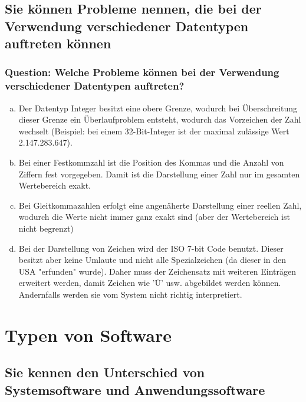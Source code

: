 \documentclass{article}
\begin{document}
\begin{adjustwidth}{2em}{2em}
\begin{adjustwidth}{2em}{2em}
			\subsection{Sie können Probleme nennen, die bei der Verwendung verschiedener Datentypen auftreten können}
			\begin{adjustwidth}{1em}{}
				\subsubsection*{Question: Welche Probleme können bei der Verwendung verschiedener Datentypen auftreten?}
				\begin{adjustwidth}{1em}{}
					\begin{enumerate}[(a)]
						\item Der Datentyp Integer besitzt eine obere Grenze, wodurch bei Überschreitung dieser Grenze ein Überlaufproblem entsteht, wodurch das Vorzeichen der Zahl wechselt (Beispiel: bei einem 32-Bit-Integer ist der maximal zulässige Wert 2.147.283.647).
						\item Bei einer Festkommzahl ist die Position des Kommas und die Anzahl von Ziffern fest vorgegeben. Damit ist die Darstellung einer Zahl nur im gesamten Wertebereich exakt.
						\item Bei Gleitkommazahlen erfolgt eine angenäherte Darstellung einer reellen Zahl, wodurch die Werte nicht immer ganz exakt sind (aber der Wertebereich ist nicht begrenzt)
						\item Bei der Darstellung von Zeichen wird der ISO 7-bit Code benutzt. Dieser besitzt aber keine Umlaute und nicht alle Spezialzeichen (da dieser in den USA "erfunden" wurde). Daher muss der Zeichensatz mit weiteren Einträgen erweitert werden, damit Zeichen wie 'Ü' usw. abgebildet werden können. Andernfalls werden sie vom System nicht richtig interpretiert.
					\end{enumerate}
				\end{adjustwidth}
			\end{adjustwidth}
		\end{adjustwidth}
		
		\newpage		
		
		\section{Typen von Software}
		\begin{adjustwidth}{2em}{2em}
			\subsection{Sie kennen den Unterschied von Systemsoftware und Anwendungssoftware}
			\begin{adjustwidth}{1em}{}

\end{adjustwidth}
\end{adjustwidth}
\end{adjustwidth}
\end{document}
